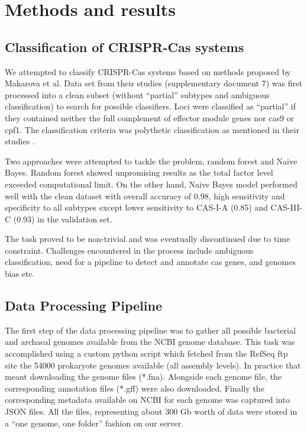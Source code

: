 \documentclass[11pt, a4paper,titlepage]{article}
\begin{document}
\section{Methods and results}

\subsection{Classification of CRISPR-Cas systems}
We attempted to classify CRISPR-Cas systems based on methods proposed
by Makarova et al. Data set from their studies (supplementary document
7) was first processed into a clean subset (without “partial” subtypes
and ambiguous classification) to search for possible classifiers. Loci
were classified as “partial” if they contained neither the full
complement of effector module genes nor cas9 or cpf1. The
classification criteria was polythetic classification as mentioned in
their studies \cite{makarova2015updated}.

Two approaches were attempted to tackle the problem, random forest and
Naive Bayes. Random forest showed unpromising results as the total
factor level exceeded computational limit. On the other hand, Naive
Bayes model performed well with the clean dataset with overall
accuracy of 0.98, high sensitivity and specificity to all subtypes
except lower sensitivity to CAS-I-A (0.85) and CAS-III-C (0.93) in the
validation set.

The task proved to be non-trivial and was eventually discontinued due
to time constraint. Challenges encountered in the process include
ambiguous classification, need for a pipeline to detect and annotate
cas genes, and genomes bias etc.

\subsection{Data Processing Pipeline}

The first step of the data processing pipeline was to gather all
possible bacterial and archaeal genomes available from the NCBI genome
database. This task was accomplished using a custom python script
which fetched from the RefSeq ftp site \cite{pruitt2007ncbi} the 54000
prokaryote genomes available (all assembly levels). In practice that
meant downloading the genome files (*.fna). Alongside each genome
file, the corresponding annotation files (*.gff) were also
downloaded. Finally the corresponding metadata available on NCBI for
each genome was captured into JSON files. All the files, representing
about 300 Gb worth of data were stored in a ``one genome, one folder''
fashion on our server.
\end{document}

